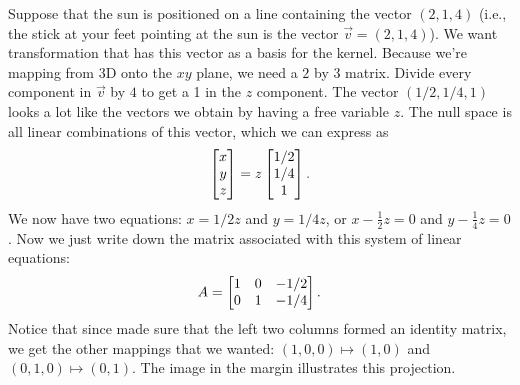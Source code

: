 \begin{example}
Suppose that the sun is positioned on a line containing the vector $(2,1,4)$ (i.e., the stick at your feet pointing at the sun is the vector $\vec v=(2,1,4)$).
We want transformation that has this vector as a basis for the kernel.  
Because we're mapping from 3D onto the $xy$ plane, we need a $2$ by $3$ matrix. 
Divide every component in $\vec v$ by $4$ to get a 1 in the $z$ component. The vector $(1/2,1/4,1)$ looks a lot like the vectors we obtain by having a free variable $z$.  The null space is all linear combinations of this vector, which we can express as $$\begin{bmatrix} x\\y\\z \end{bmatrix} = z\begin{bmatrix} 1/2\\1/4\\1 \end{bmatrix}. $$ We now have two equations: $x=1/2 z$ and $y=1/4z$, or $x-\frac12 z=0$ and $y-\frac14 z=0$.  Now we just write down the matrix associated with this system of linear equations: $$A=\begin{bmatrix} 1&0&-1/2\\0&1&-1/4 \end{bmatrix}.$$
Notice that since made sure that the left two columns formed an identity matrix, we get the other mappings that we wanted: $(1,0,0)\mapsto (1,0)$ and $(0,1,0)\mapsto (0,1)$.
The image in the margin illustrates this projection. 
\end{example}


